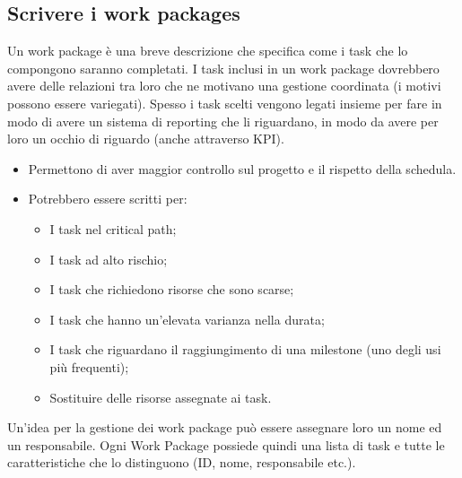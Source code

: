 \subsection{Scrivere i work packages}
Un work package è una breve descrizione che specifica come i task che lo compongono saranno completati. I task inclusi in un work package dovrebbero avere delle relazioni tra loro che ne motivano una gestione coordinata (i motivi possono essere variegati). Spesso i task scelti vengono legati insieme per fare in modo di avere un sistema di reporting che li riguardano, in modo da avere per loro un occhio di riguardo (anche attraverso KPI).
\begin{itemize}
	\item Permettono di aver maggior controllo sul progetto e il rispetto della schedula.
	\item Potrebbero essere scritti per:
	\begin{itemize}
		\item I task nel critical path;
		\item I task ad alto rischio;
		\item I task che richiedono risorse che sono scarse;
		\item I task che hanno un’elevata varianza nella durata;
		\item I task che riguardano il raggiungimento di una milestone (uno degli usi più frequenti);
		\item Sostituire delle risorse assegnate ai task.
	\end{itemize}
\end{itemize}
Un'idea per la gestione dei work package può essere assegnare loro un nome ed un responsabile.
\noindent Ogni Work Package possiede quindi una lista di task e tutte le caratteristiche che lo distinguono (ID, nome, responsabile etc.).
